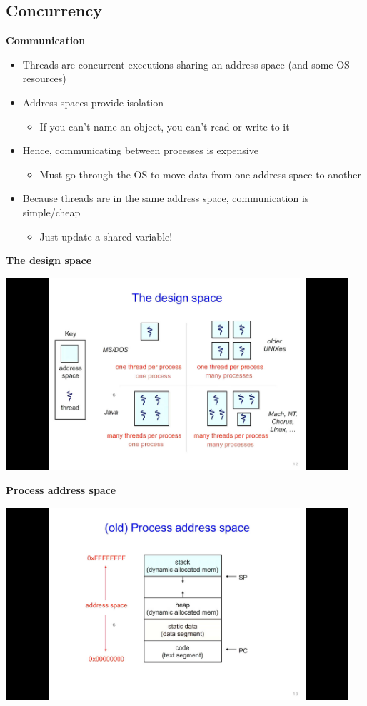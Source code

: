 \documentclass[11pt,a4paper]{article}
\begin{document}
\subsection{Concurrency}

\textbf{Communication}
\begin{itemize}
    \item Threads are concurrent executions sharing an address space (and some OS resources)
    \item Address spaces provide isolation
        \begin{itemize}
            \item If you can't name an object, you can't read or write to it
        \end{itemize}
    \item Hence, communicating between processes is expensive
        \begin{itemize}
            \item Must go through the OS to move data from one address space to another
        \end{itemize}
    \item Because threads are in the same address space, communication is simple/cheap
        \begin{itemize}
            \item Just update a shared variable!
        \end{itemize}
\end{itemize}

\textbf{The design space}

\includegraphics[height=270]{the-design-space.jpg}

\textbf{Process address space}

\includegraphics[height=270]{process-address-space.jpg}
\end{document}
